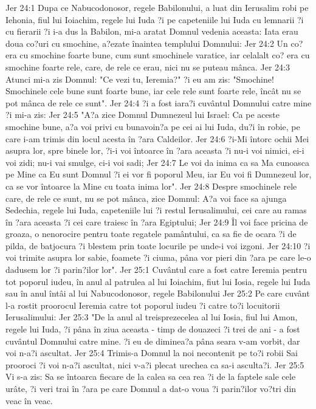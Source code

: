 Jer 24:1  Dupa ce Nabucodonosor, regele Babilonului, a luat din Ierusalim robi pe Iehonia, fiul lui Ioiachim, regele lui Iuda ?i pe capeteniile lui Iuda cu lemnarii ?i cu fierarii ?i i-a dus la Babilon, mi-a aratat Domnul vedenia aceasta: Iata erau doua co?uri cu smochine, a?ezate înaintea templului Domnului:
Jer 24:2  Un co? era cu smochine foarte bune, cum sunt smochinele varatice, iar celalalt co? era cu smochine foarte rele, care, de rele ce erau, nici nu se puteau mânca.
Jer 24:3  Atunci mi-a zis Domnul: "Ce vezi tu, Ieremia?" ?i eu am zis: "Smochine! Smochinele cele bune sunt foarte bune, iar cele rele sunt foarte rele, încât nu se pot mânca de rele ce sunt".
Jer 24:4  ?i a fost iara?i cuvântul Domnului catre mine ?i mi-a zis:
Jer 24:5  "A?a zice Domnul Dumnezeul lui Israel: Ca pe aceste smochine bune, a?a voi privi cu bunavoin?a pe cei ai lui Iuda, du?i în robie, pe care i-am trimis din locul acesta în ?ara Caldeilor.
Jer 24:6  ?i-Mi întorc ochii Mei asupra lor, spre binele lor, ?i-i voi întoarce în ?ara aceasta ?i nu-i voi nimici, ei-i voi zidi; nu-i vai smulge, ci-i voi sadi;
Jer 24:7  Le voi da inima ca sa Ma cunoasca pe Mine ca Eu sunt Domnul ?i ei vor fi poporul Meu, iar Eu voi fi Dumnezeul lor, ca se vor întoarce la Mine cu toata inima lor".
Jer 24:8  Despre smochinele rele care, de rele ce sunt, nu se pot mânca, zice Domnul: A?a voi face sa ajunga Sedechia, regele lui Iuda, capeteniile lui ?i restul Ierusalimului, cei care au ramas în ?ara aceasta ?i cei care traiesc în ?ara Egiptului;
Jer 24:9  Îl voi face pricina de groaza, o nenorocire pentru toate regatele pamântului, ca sa fie de ocara ?i de pilda, de batjocura ?i blestem prin toate locurile pe unde-i voi izgoni.
Jer 24:10  ?i voi trimite asupra lor sabie, foamete ?i ciuma, pâna vor pieri din ?ara pe care le-o dadusem lor ?i parin?ilor lor".
Jer 25:1  Cuvântul care a fost catre Ieremia pentru tot poporul iudeu, în anul al patrulea al lui Ioiachim, fiut lui Iosia, regele lui Iuda sau în anul întâi al lui Nabucodonosor, regele Babilonului
Jer 25:2  Pe care cuvânt l-a rostit proorocul Ieremia catre tot poporul iudeu ?i catre to?i locuitorii Ierusalimului:
Jer 25:3  "De la anul al treisprezecelea al lui Iosia, fiul lui Amon, regele lui Iuda, ?i pâna în ziua aceasta - timp de douazeci ?i trei de ani - a fost cuvântul Domnului catre mine. ?i eu de diminea?a pâna seara v-am vorbit, dar voi n-a?i ascultat.
Jer 25:4  Trimis-a Domnul la noi necontenit pe to?i robii Sai prooroci ?i voi n-a?i ascultat, nici v-a?i plecat urechea ca sa-i asculta?i.
Jer 25:5  Vi s-a zis: Sa se întoarca fiecare de la calea sa cea rea ?i de la faptele sale cele urâte, ?i veri trai în ?ara pe care Domnul a dat-o voua ?i parin?ilor vo?tri din veac în veac.
